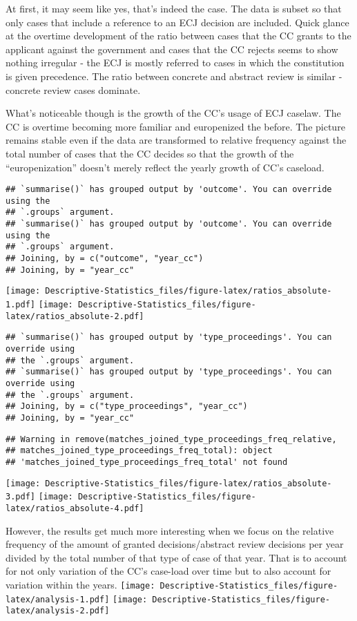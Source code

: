 \documentclass[
]{article}
\begin{document}
At first, it may seem like yes, that's indeed the case. The data is
subset so that only cases that include a reference to an ECJ decision
are included. Quick glance at the overtime development of the ratio
between cases that the CC grants to the applicant against the government
and cases that the CC rejects seems to show nothing irregular - the ECJ
is mostly referred to cases in which the constitution is given
precedence. The ratio between concrete and abstract review is similar -
concrete review cases dominate.

What's noticeable though is the growth of the CC's usage of ECJ caselaw.
The CC is overtime becoming more familiar and europenized the before.
The picture remains stable even if the data are transformed to relative
frequency against the total number of cases that the CC decides so that
the growth of the ``europenization'' doesn't merely reflect the yearly
growth of CC's caseload.

\begin{verbatim}
## `summarise()` has grouped output by 'outcome'. You can override using the
## `.groups` argument.
## `summarise()` has grouped output by 'outcome'. You can override using the
## `.groups` argument.
## Joining, by = c("outcome", "year_cc")
## Joining, by = "year_cc"
\end{verbatim}

\texttt{[image: Descriptive-Statistics\_files/figure-latex/ratios\_absolute-1.pdf]}
\texttt{[image: Descriptive-Statistics\_files/figure-latex/ratios\_absolute-2.pdf]}

\begin{verbatim}
## `summarise()` has grouped output by 'type_proceedings'. You can override using
## the `.groups` argument.
## `summarise()` has grouped output by 'type_proceedings'. You can override using
## the `.groups` argument.
## Joining, by = c("type_proceedings", "year_cc")
## Joining, by = "year_cc"
\end{verbatim}

\begin{verbatim}
## Warning in remove(matches_joined_type_proceedings_freq_relative,
## matches_joined_type_proceedings_freq_total): object
## 'matches_joined_type_proceedings_freq_total' not found
\end{verbatim}

\texttt{[image: Descriptive-Statistics\_files/figure-latex/ratios\_absolute-3.pdf]}
\texttt{[image: Descriptive-Statistics\_files/figure-latex/ratios\_absolute-4.pdf]}

However, the results get much more interesting when we focus on the
relative frequency of the amount of granted decisions/abstract review
decisions per year divided by the total number of that type of case of
that year. That is to account for not only variation of the CC's
case-load over time but to also account for variation within the years.
\texttt{[image: Descriptive-Statistics\_files/figure-latex/analysis-1.pdf]}
\texttt{[image: Descriptive-Statistics\_files/figure-latex/analysis-2.pdf]}
\end{document}
